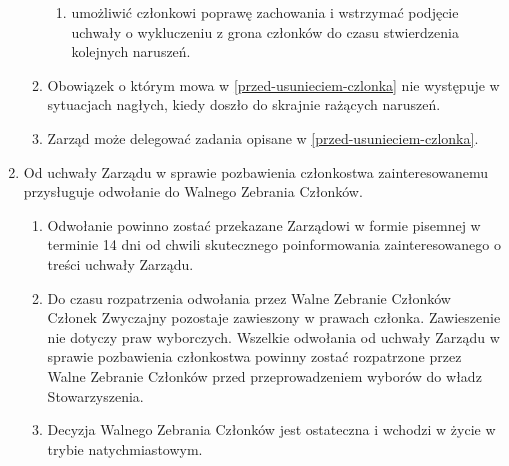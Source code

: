 \documentclass{article}
\begin{document}
\begin{enumerate}
\begin{enumerate}
\begin{enumerate}
          \item umożliwić członkowi poprawę zachowania i wstrzymać podjęcie uchwały o wykluczeniu z grona członków do czasu stwierdzenia kolejnych naruszeń.
        \end{enumerate}
        \item Obowiązek o którym mowa w \ref{przed-usunieciem-czlonka} nie występuje w sytuacjach nagłych, kiedy doszło do skrajnie rażących naruszeń.
        \item Zarząd może delegować zadania opisane w \ref{przed-usunieciem-czlonka}.
      \end{enumerate}
      \item Od uchwały Zarządu w sprawie pozbawienia członkostwa zainteresowanemu przysługuje odwołanie do Walnego Zebrania Członków.
      \begin{enumerate}
        \item Odwołanie powinno zostać przekazane Zarządowi w formie pisemnej w terminie 14 dni od chwili skutecznego poinformowania zainteresowanego o treści uchwały Zarządu.
        \item Do czasu rozpatrzenia odwołania przez Walne Zebranie Członków Członek Zwyczajny pozostaje zawieszony w prawach członka. Zawieszenie nie dotyczy praw wyborczych. Wszelkie odwołania od uchwały Zarządu w sprawie pozbawienia członkostwa powinny zostać rozpatrzone przez Walne Zebranie Członków przed przeprowadzeniem wyborów do władz Stowarzyszenia.
        \item Decyzja Walnego Zebrania Członków jest ostateczna i wchodzi w życie w trybie natychmiastowym.
      \end{enumerate}
  \end{enumerate}
\end{document}
